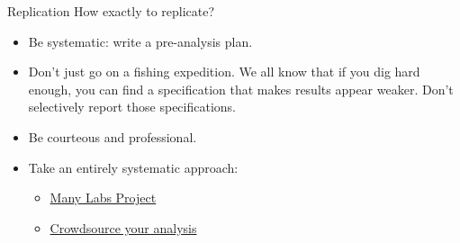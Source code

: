 \documentclass{beamer}
\begin{document}
\begin{frame}{Replication}
How exactly to replicate?
\begin{itemize}
\item Be systematic: write a pre-analysis plan.
\item Don't just go on a fishing expedition. We all know that if you dig hard enough, you can find a specification that makes results appear weaker. Don't selectively report those specifications.
\item Be courteous and professional.
\item Take an entirely systematic approach:
\begin{itemize}
\item \href{https://osf.io/wx7ck/}{Many Labs Project}
\item \href{https://osf.io/gvm2z/}{Crowdsource your analysis}
\end{itemize}
\end{itemize}
\end{frame}
\end{document}
